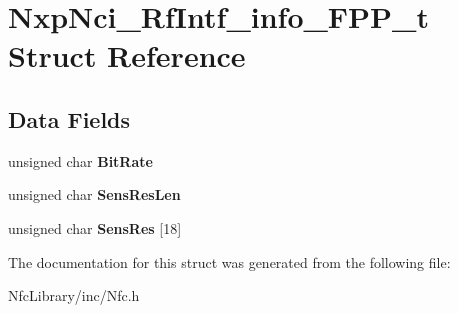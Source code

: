 \hypertarget{struct_nxp_nci___rf_intf__info___f_p_p__t}{}\section{Nxp\+Nci\+\_\+\+Rf\+Intf\+\_\+info\+\_\+\+F\+P\+P\+\_\+t Struct Reference}
\label{struct_nxp_nci___rf_intf__info___f_p_p__t}
\subsection*{Data Fields}
\begin{DoxyCompactItemize}
\item 
\mbox{\label{struct_nxp_nci___rf_intf__info___f_p_p__t_a794125707ff4d1be577172cd5af5adbd}} 
unsigned char {\bfseries Bit\+Rate}
\item 
\mbox{\label{struct_nxp_nci___rf_intf__info___f_p_p__t_a8e7877c8e05ffe49561c3844ece0057a}} 
unsigned char {\bfseries Sens\+Res\+Len}
\item 
\mbox{\label{struct_nxp_nci___rf_intf__info___f_p_p__t_af864132d15d2818344cfbd0014aa3e0c}} 
unsigned char {\bfseries Sens\+Res} \mbox{[}18\mbox{]}
\end{DoxyCompactItemize}


The documentation for this struct was generated from the following file\+:\begin{DoxyCompactItemize}
\item 
Nfc\+Library/inc/Nfc.\+h\end{DoxyCompactItemize}
